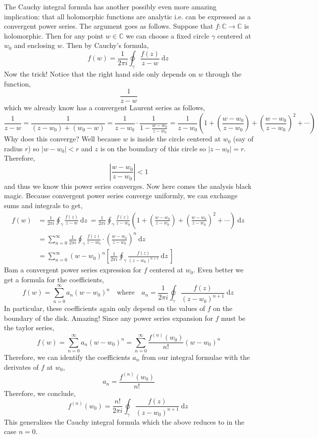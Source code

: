 \documentclass{article}
\newcommand{\C}{\mathbb{C}}
\renewcommand{\d}[1]{\: \mathrm{d}#1 \:}
\theoremstyle{definition}
\begin{document}
The Cauchy integral formula has another possibly even more amazing implication: that all holomorphic functions are analytic i.e. can be expressed as a convergent power series. The argument goes as follows. Suppose that $f : \C \to \C$ is holomorphic. Then for any point $w \in \C$ we can choose a fixed circle $\gamma$ centered at $w_0$ and enclosing $w$. Then by Cauchy's formula,
\[ f(w) = \frac{1}{2 \pi i} \oint_\gamma \frac{f(z)}{z - w} \d{z} \]
Now the trick! Notice that the right hand side only depends on $w$ through the function,
\[ \frac{1}{z - w}  \]
which we already know has a convergent Laurent series as follows,
\[ \frac{1}{z - w} = \frac{1}{(z - w_0) + (w_0 - w)} = \frac{1}{z - w_0} \cdot \frac{1}{1 - \frac{w - w_0}{z - w_0}} = \frac{1}{z - w_0} \left( 1 + \left( \frac{w - w_0}{z - w_0} \right) + \left( \frac{w - w_0}{z - w_0} \right)^2 + \cdots \right) \]
Why does this converge? Well because $w$ is inside the circle centered at $w_0$ (say of radius $r$) so $|w - w_0| < r$ and $z$ is on the boundary of this circle so $|z - w_0| = r$. Therefore,
\[ \left| \frac{w - w_0}{z - w_0} \right| < 1 \]
and thus we know this power series converges. Now here comes the analysis black magic. Because convergent power series converge uniformly, we can exchange sums and integrals to get,
\begin{align*}
f(w) & = \frac{1}{2 \pi i} \oint_\gamma \frac{f(z)}{z - w} \d{z} = \frac{1}{2 \pi i} \oint_{\gamma} \frac{f(z)}{z - w_0} \left( 1 + \left( \frac{w - w_0}{z - w_0} \right) + \left(\frac{w - w_0}{z - w_0} \right)^2 + \cdots \right)  \d{z} 
\\
& = \sum_{n = 0}^{\infty} \frac{1}{2 \pi i} \oint_{\gamma} \frac{f(z)}{z - w_0} \cdot \left( \frac{w - w_0}{z - w_0} \right)^{n} \d{z}
\\
& = \sum_{n = 0}^\infty (w - w_0)^n \left[ \frac{1}{2 \pi i} \oint_{\gamma} \frac{f(z)}{(z - w_0)^{n+1}} \d{z} \right] 
\end{align*}
Bam a convergent power series expression for $f$ centered at $w_0$. Even better we get a formula for the coefficients,
\[ f(w) = \sum_{n = 0}^\infty a_n (w - w_0)^n \quad \text{where} \quad a_n = \frac{1}{2 \pi i} \oint_{\gamma} \frac{f(z)}{(z - w_0)^{n+1}} \d{z} \]
In particular, these coefficients again only depend on the values of $f$ on the boundary of the disk. Amazing! 
Since any power series expansion for $f$ must be the taylor series,
\[ f(w) = \sum_{n = 0}^\infty a_n (w - w_0)^n = \sum_{n = 0}^\infty \frac{f^{(n)}(w_0)}{n!} (w - w_0)^n \]
Therefore, we can identify the coefficients $a_n$ from our integral formulae with the derivates of $f$ at $w_0$,
\[ a_n = \frac{f^{(n)}(w_0)}{n!} \]
Therefore, we conclude,
\[ f^{(n)}(w_0) = \frac{n!}{2 \pi i} \oint_\gamma \frac{f(z)}{(z - w_0)^{n+1}} \d{z} \]
This generalizes the Cauchy integral formula which the above reduces to in the case $n = 0$.
\end{document}

